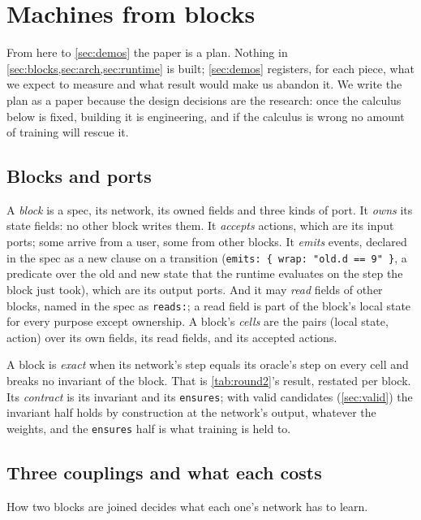\section{Machines from blocks}
\label{sec:blocks}

From here to \cref{sec:demos} the paper is a plan. Nothing in \cref{sec:blocks,sec:arch,sec:runtime} is built;
\cref{sec:demos} registers, for each piece, what we expect to measure and what result would make us abandon it.
We write the plan as a paper because the design decisions are the research: once the calculus below is fixed,
building it is engineering, and if the calculus is wrong no amount of training will rescue it.

\subsection{Blocks and ports}
\label{sec:ports}

A \emph{block} is a spec, its network, its owned fields and three kinds of port. It \emph{owns} its state
fields: no other block writes them. It \emph{accepts} actions, which are its input ports; some arrive from a
user, some from other blocks. It \emph{emits} events, declared in the spec as a new clause on a transition
(\texttt{emits: \{ wrap: "old.d == 9" \}}, a predicate over the old and new state that the runtime evaluates
on the step the block just took), which are its output ports. And it may \emph{read} fields of other blocks, named in the spec as
\texttt{reads:}; a read field is part of the block's local state for every purpose except ownership. A block's
\emph{cells} are the pairs (local state, action) over its own fields, its read fields, and its accepted actions.

A block is \emph{exact} when its network's step equals its oracle's step on every cell and breaks no invariant
of the block. That is \cref{tab:round2}'s result, restated per block. Its \emph{contract} is its invariant and
its \texttt{ensures}; with valid candidates (\cref{sec:valid}) the invariant half holds by construction at the
network's output, whatever the weights, and the \texttt{ensures} half is what training is held to.

\subsection{Three couplings and what each costs}
\label{sec:couplings}

How two blocks are joined decides what each one's network has to learn.

